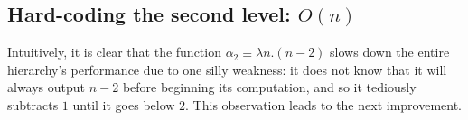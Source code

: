 
\subsection{Hard-coding the second level: $O(n)$} \label{sect: hard-code-lvl2}

Intuitively, it is clear that the function $\alpha_2 \equiv \lambda n.(n-2)$ 
slows down the entire hierarchy's performance due to one silly weakness: 
it does not know that it will always output $n-2$ before beginning its computation, 
and so it tediously subtracts $1$ until it goes below $2$. 
This observation leads to the next improvement.

